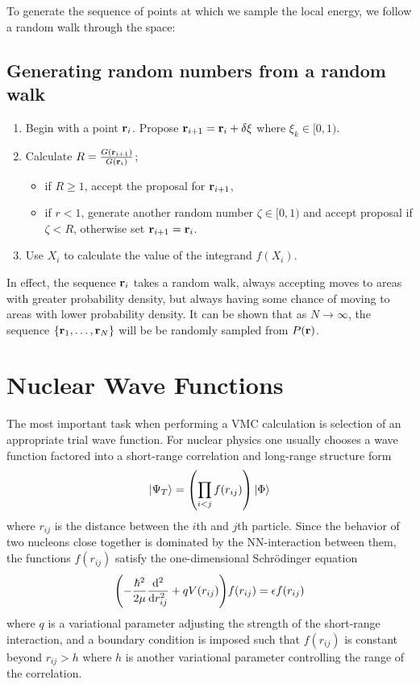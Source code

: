 \documentclass[aps,prl,preprint,groupedaddress]{revtex4-1}
\begin{document}
To generate the sequence of points at which we sample the local energy, we follow
a random walk through the space:
\subsection{Generating random numbers from a random walk}
\begin{enumerate}
\item Begin with a point \(\vb{r}_i\). Propose \(\vb{r}_{i+1}=\vb{r}_i+\delta \vb{\xi}\)
      where \(\xi_k \in [0,1)\).
\item Calculate \(R = \frac{G(\vb{r}_{i+1})}{G(\vb{r}_i)}\);
\begin{itemize}
    \item if \(R \geq 1\), accept the proposal for \(\vb{r}_{i+1}\),
    \item if \(r < 1\), generate another random number \(\zeta \in [0,1)\) and
          accept proposal if \(\zeta < R\), otherwise set \(\vb{r}_{i+1} = \vb{r}_i\).
\end{itemize}
\item Use \(X_i\) to calculate the value of the integrand \(f(X_i)\).
\end{enumerate}
In effect, the sequence \(\vb{r}_i\) takes a random walk, always accepting moves
to areas with greater probability density, but always having some chance of
moving to areas with lower probability density. It can be shown \cite{kalos_whitlock_2008}
that as \(N \rightarrow \infty\), the sequence \(\{\vb{r}_1,\dots,\vb{r}_N\}\)
will be be randomly sampled from \(P(\vb{r})\).

\section{Nuclear Wave Functions}
The most important task when performing a VMC calculation is selection of an
appropriate trial wave function. For nuclear physics one usually chooses a wave
function factored into a short-range correlation and long-range structure form
\cite{RevModPhys.87.1067,hjorth-jensen_2013}
\[ \ket{\Psi_T} = \qty(\prod_{i<j} f(r_{ij})) \ket{\Phi} \]
where \(r_{ij}\) is the distance between the \(i\)th and \(j\)th particle. Since
the behavior of two nucleons close together is dominated by the NN-interaction
between them, the functions \(f(r_{ij})\) satisfy the one-dimensional
Schr\"{o}dinger equation
\[ \qty(-\frac{\hbar^2}{2\mu} \dv[2]{r_{ij}} + q V(r_{ij})) f(r_{ij}) = \epsilon f(r_{ij}) \]
where \(q\) is a variational parameter adjusting the strength of the short-range
interaction, and a boundary condition is imposed such that \(f(r_{ij})\) is
constant beyond \(r_{ij} > h\) where \(h\) is another variational parameter
controlling the range of the correlation.
\end{document}
